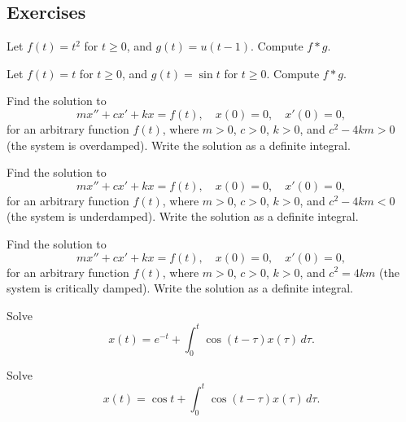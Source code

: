 \subsection{Exercises}

\begin{exercise}
Let $f(t) = t^2$ for $t \geq 0$, and $g(t) = u(t-1)$.  Compute
$f * g$.
\end{exercise}

\begin{exercise}
Let $f(t) = t$ for $t \geq 0$, and $g(t) = \sin t $ for $t \geq 0$.  Compute
$f * g$.
\end{exercise}

\begin{exercise}
Find the solution to
\begin{equation*}
m x'' + c x' + k x = f(t) , \quad x(0) = 0, \quad x'(0) = 0 ,
\end{equation*}
for an arbitrary function $f(t)$, where $m > 0$, $c > 0$, $k > 0$,
and $c^2 - 4km > 0$ (the system is overdamped).
Write the solution as a definite integral.
\end{exercise}

\begin{exercise}
Find the solution to
\begin{equation*}
m x'' + c x' + k x = f(t) , \quad x(0) = 0, \quad x'(0) = 0 ,
\end{equation*}
for an arbitrary function $f(t)$, where $m > 0$, $c > 0$, $k > 0$,
and $c^2 - 4km < 0$ (the system is underdamped).
Write the solution as a definite integral.
\end{exercise}

\begin{exercise}
Find the solution to
\begin{equation*}
m x'' + c x' + k x = f(t) , \quad x(0) = 0, \quad x'(0) = 0 ,
\end{equation*}
for an arbitrary function $f(t)$, where $m > 0$, $c > 0$, $k > 0$,
and $c^2 = 4km$ (the system is critically damped).
Write the solution as a definite integral.
\end{exercise}

\begin{exercise}
Solve
\begin{equation*}
x(t) =  e^{-t} + \int_0^t \cos(t-\tau) x(\tau) \, d\tau .
\end{equation*}
\end{exercise}

\begin{exercise}
Solve
\begin{equation*}
x(t) =  \cos t + \int_0^t \cos(t-\tau) x(\tau) \, d\tau .
\end{equation*}
\end{exercise}

